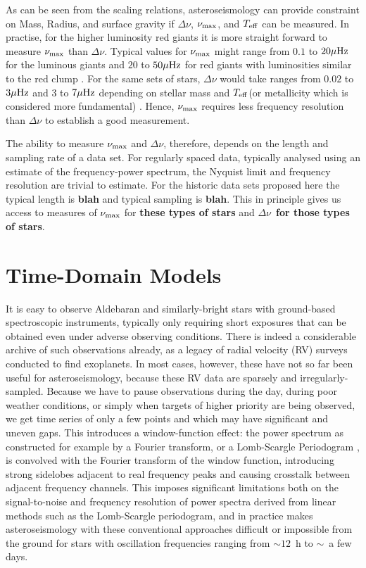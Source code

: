 \documentclass[modern]{aastex61}
\newcommand{\numax}{\mbox{$\nu_{\rm max}$}\xspace}
\newcommand{\Dnu}{\mbox{$\Delta \nu$}\xspace}
\newcommand{\teff}{\mbox{$T_{\rm eff}$}\xspace}
\newcommand{\guy}[1]{{\bf \color{blue} #1}}
\begin{document}
As can be seen from the scaling relations, asteroseismology can provide constraint on Mass, Radius, and surface gravity if \Dnu, \numax, and \teff can be measured.  In practise, for the higher luminosity red giants it is more straight forward to measure \numax than \Dnu.  Typical values for \numax might range from $0.1$ to $20 \rm \mu Hz$ for the luminous giants and $20$ to $50 \rm \mu Hz$ for red giants with luminosities similar to the red clump .  For the same sets of stars, \Dnu would take ranges from $0.02$ to $3 \rm \mu Hz$ and $3$ to $7 \rm \mu Hz$ depending on stellar mass and \teff (or metallicity which is considered more fundamental) \citep[e.g.,][]{2011A&A...525L...9M, 2013A&A...559A.137M}.  Hence, \numax requires less frequency resolution than \Dnu to establish a good measurement.

The ability to measure \numax and \Dnu, therefore, depends on the length and sampling rate of a data set.  For regularly spaced data, typically analysed using an estimate of the frequency-power spectrum, the Nyquist limit and frequency resolution are trivial to estimate.  For the historic data sets proposed here the typical length is \guy{blah} and typical sampling is \guy{blah}.  This in principle gives us access to measures of \numax for \guy{these types of stars} and \Dnu $\,$ \guy{for those types of stars}. 

\section{Time-Domain Models}

It is easy to observe Aldebaran and similarly-bright stars with ground-based spectroscopic instruments, typically only requiring short exposures that can be obtained even under adverse observing conditions. There is indeed a considerable archive of such observations already, as a legacy of radial velocity (RV) surveys conducted to find exoplanets. In most cases, however, these have not so far been useful for asteroseismology, because these RV data are sparsely and irregularly-sampled. Because we have to pause observations during the day, during poor weather conditions, or simply when targets of higher priority are being observed, we get time series of only a few points and which may have significant and uneven gaps. This introduces a window-function effect: the power spectrum as constructed for example by a Fourier transform, or a Lomb-Scargle Periodogram \citep{lomb,scargle}, is convolved with the Fourier transform of the window function, introducing strong sidelobes adjacent to real frequency peaks and causing crosstalk between adjacent frequency channels. This imposes significant limitations both on the signal-to-noise and frequency resolution of power spectra derived from linear methods such as the Lomb-Scargle periodogram, and in practice makes asteroseismology with these conventional approaches difficult or impossible from the ground for stars with oscillation frequencies ranging from $\sim 12$~h to $\sim$~a few days. 
\end{document}
